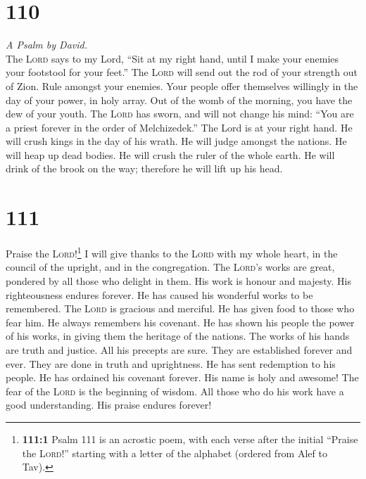 \hypertarget{section-109}{%
\section{110}\label{section-109}}

\emph{A Psalm by David.}\\
 The \textsc{Lord} says to my Lord, ``Sit at my right
hand, until I make your enemies your footstool for your feet.''
 The \textsc{Lord} will send out the rod of your strength
out of Zion. Rule amongst your enemies.  Your people offer
themselves willingly in the day of your power, in holy array. Out of the
womb of the morning, you have the dew of your youth.  The
\textsc{Lord} has sworn, and will not change his mind: ``You are a
priest forever in the order of Melchizedek.''  The Lord is
at your right hand. He will crush kings in the day of his wrath.
 He will judge amongst the nations. He will heap up dead
bodies. He will crush the ruler of the whole earth.  He
will drink of the brook on the way; therefore he will lift up his head.

\hypertarget{section-110}{%
\section{111}\label{section-110}}

 Praise the \textsc{Lord}!\footnote{\textbf{111:1} Psalm
  111 is an acrostic poem, with each verse after the initial ``Praise
  the \textsc{Lord}!'' starting with a letter of the alphabet (ordered
  from Alef to Tav).} I will give thanks to the \textsc{Lord} with my
whole heart, in the council of the upright, and in the congregation.
 The \textsc{Lord}'s works are great, pondered by all
those who delight in them.  His work is honour and
majesty. His righteousness endures forever.  He has caused
his wonderful works to be remembered. The \textsc{Lord} is gracious and
merciful.  He has given food to those who fear him. He
always remembers his covenant.  He has shown his people
the power of his works, in giving them the heritage of the nations.
 The works of his hands are truth and justice. All his
precepts are sure.  They are established forever and ever.
They are done in truth and uprightness.  He has sent
redemption to his people. He has ordained his covenant forever. His name
is holy and awesome!  The fear of the \textsc{Lord} is
the beginning of wisdom. All those who do his work have a good
understanding. His praise endures forever!


